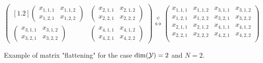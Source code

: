 \begin{figure}
	\begin{equation*}
		\begin{pmatrix}[1.2]
			\begin{pmatrix}
				x_{1, 1, 1} & x_{1, 1, 2}\\
				x_{1, 2, 1} & x_{1, 2, 2}
			\end{pmatrix}
			& \begin{pmatrix}
				x_{2, 1, 1} & x_{2, 1, 2}\\
				x_{2, 2, 1} & x_{2, 2, 2}
			\end{pmatrix}\\
			\begin{pmatrix}
			x_{3, 1, 1} & x_{3, 1, 2}\\
			x_{3, 2, 1} & x_{3, 2, 2}
			\end{pmatrix} 
			& \begin{pmatrix}
			x_{4, 1, 1} & x_{4, 1, 2}\\
			x_{4, 2, 1} & x_{4, 2, 2}
			\end{pmatrix}
		\end{pmatrix}
		\stackrel{\psi}{\longleftrightarrow}
		\begin{pmatrix}
			x_{1, 1, 1} & x_{1, 1, 2} & x_{3, 1, 1} & x_{3, 1, 2} \\
			x_{1, 2, 1} & x_{1, 2, 2} & x_{3, 2, 1} & x_{3, 2, 2} \\
			x_{2, 1, 1} & x_{2, 1, 2} & x_{4, 1, 1} & x_{4, 1, 2} \\
			x_{2, 2, 1} & x_{2, 2, 2} & x_{4, 2, 1} & x_{4, 2, 2} \\
		\end{pmatrix}
	\end{equation*}
	\caption{Example of matrix "flattening" for the case $\mathrm{dim}(\mathcal{Y}) = 2$ and $N = 2$.}
	\label{fig:block-operator-example}
\end{figure}